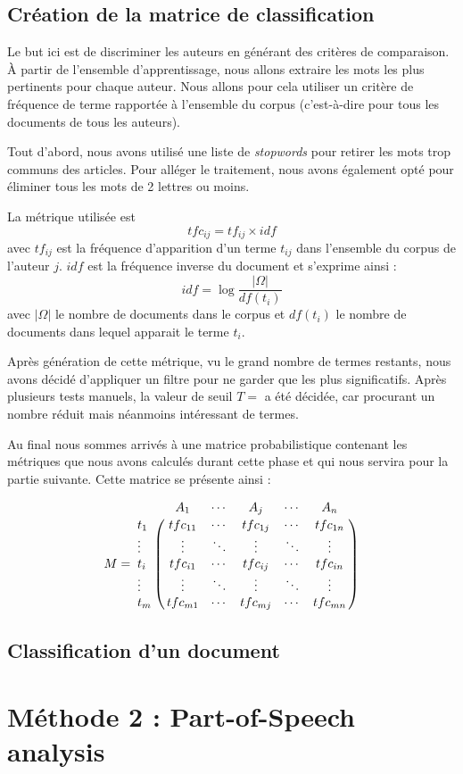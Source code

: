\documentclass[a4paper]{article}
\begin{document}
\subsection{Création de la matrice de classification}
Le but ici est de discriminer les auteurs en générant des critères de comparaison. À partir de l'ensemble d'apprentissage, nous allons extraire les mots les plus pertinents pour chaque auteur. Nous allons pour cela utiliser un critère de fréquence de terme rapportée à l'ensemble du corpus (c'est-à-dire pour tous les documents de tous les auteurs).

Tout d'abord, nous avons utilisé une liste de \textit{stopwords} pour retirer les mots trop communs des articles. Pour alléger le traitement, nous avons également opté pour éliminer tous les mots de 2 lettres ou moins. 

La métrique utilisée est \[ tfc_{ij} = tf_{ij} \times idf\] avec $tf_{ij}$ est la fréquence d'apparition d'un terme $t_{ij}$ dans l'ensemble du corpus de l'auteur $j$. $idf$ est la fréquence inverse du document et s'exprime ainsi : \[idf = \log \frac{|\Omega|}{df(t_{i})} \] avec $|\Omega|$ le nombre de documents dans le corpus et $df(t_{i})$ le nombre de documents dans lequel apparait le terme $t_{i}$.

Après génération de cette métrique, vu le grand nombre de termes restants, nous avons décidé d'appliquer un filtre pour ne garder que les plus significatifs. Après plusieurs tests manuels, la valeur de seuil $T = $  a été décidée, car procurant un nombre réduit mais néanmoins intéressant de termes.

Au final nous sommes arrivés à une matrice probabilistique contenant les métriques que nous avons calculés durant cette phase et qui nous servira pour la partie suivante. Cette matrice se présente ainsi :

\[M=\bordermatrix{
&A_{1}&\cdots&A_{j}&\cdots&A_{n}\cr
t_{1}& tfc_{11} & \cdots & tfc_{1j} & \cdots & tfc_{1n} \cr
\vdots&\vdots&\ddots&\vdots&\ddots&\vdots\cr
t_{i}& tfc_{i1} & \cdots & tfc_{ij} & \cdots & tfc_{in} \cr
\vdots&\vdots&\ddots&\vdots&\ddots&\vdots\cr
t_{m}& tfc_{m1} & \cdots & tfc_{mj} & \cdots & tfc_{mn} \cr
}\]
\subsection{Classification d'un document}

\section{Méthode 2 : Part-of-Speech analysis}
\end{document}
